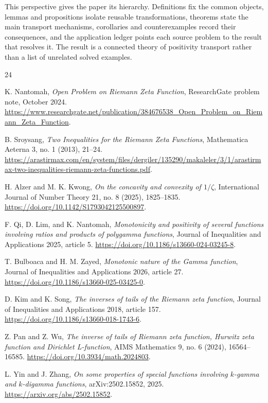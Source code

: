 \documentclass[11pt]{article}
\numberwithin{equation}{section}
\theoremstyle{definition}
\theoremstyle{remark}
\newcommand{\1}{\mathbf 1}
\begin{document}
This perspective gives the paper its hierarchy.  Definitions fix the common
objects, lemmas and propositions isolate reusable transformations, theorems
state the main transport mechanisms, corollaries and counterexamples record
their consequences, and the application ledger points each source problem to
the result that resolves it.  The result is a connected theory of positivity
transport rather than a list of unrelated solved examples.
\begin{thebibliography}{24}

K. Nantomah,
\emph{Open Problem on Riemann Zeta Function},
ResearchGate problem note, October 2024.
\url{https://www.researchgate.net/publication/384676538_Open_Problem_on_Riemann_Zeta_Function}.

B. Sroysang,
\emph{Two Inequalities for the Riemann Zeta Functions},
Mathematica Aeterna 3, no. 1 (2013), 21--24.
\url{https://arastirmax.com/en/system/files/dergiler/135290/makaleler/3/1/arastirmax-two-inequalities-riemann-zeta-functions.pdf}.

H. Alzer and M. K. Kwong,
\emph{On the concavity and convexity of \(1/\zeta\)},
International Journal of Number Theory 21, no. 8 (2025), 1825--1835.
\url{https://doi.org/10.1142/S1793042125500897}.

F. Qi, D. Lim, and K. Nantomah,
\emph{Monotonicity and positivity of several functions involving ratios and products of polygamma functions},
Journal of Inequalities and Applications 2025, article 5.
\url{https://doi.org/10.1186/s13660-024-03245-8}.

T. Bulboaca and H. M. Zayed,
\emph{Monotonic nature of the Gamma function},
Journal of Inequalities and Applications 2026, article 27.
\url{https://doi.org/10.1186/s13660-025-03425-0}.

D. Kim and K. Song,
\emph{The inverses of tails of the Riemann zeta function},
Journal of Inequalities and Applications 2018, article 157.
\url{https://doi.org/10.1186/s13660-018-1743-6}.

Z. Pan and Z. Wu,
\emph{The inverse of tails of Riemann zeta function, Hurwitz zeta function and Dirichlet L-function},
AIMS Mathematics 9, no. 6 (2024), 16564--16585.
\url{https://doi.org/10.3934/math.2024803}.


L. Yin and J. Zhang,
\emph{On some properties of special functions involving \(k\)-gamma and \(k\)-digamma functions},
arXiv:2502.15852, 2025.
\url{https://arxiv.org/abs/2502.15852}.



\end{thebibliography}
\end{document}
